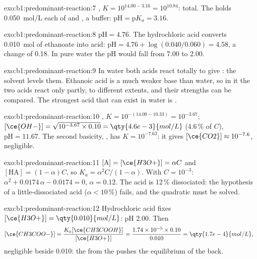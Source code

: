 \begin{solution}{exo:b1:predominant-reaction:7}
, $K = 10^{14.00 - 3.16} = 10^{10.84}$: total. The
 holds \qty{0.050}{mol/L} each of  and , a
buffer: $\mathrm{pH} = \mathrm{p}K_a = 3.16$.
\end{solution}

\begin{solution}{exo:b1:predominant-reaction:8}
$\mathrm{pH} = 4.76$. The hydrochloric acid converts \qty{0.010}{mol} of
ethanoate into acid: $\mathrm{pH} = 4.76 + \log(0.040/0.060) = 4.58$, a
change of 0.18. In pure water the pH would fall from 7.00 to 2.00.
\end{solution}

\begin{solution}{exo:b1:predominant-reaction:9}
In water both acids react totally to give : the solvent levels
them. Ethanoic acid is a much weaker base than water, so in it the two
acids react only partly, to different extents, and their strengths can be
compared. The strongest acid that can exist in water is .
\end{solution}

\begin{solution}{exo:b1:predominant-reaction:10}
, $K = 10^{-(14.00 - 10.33)} = 10^{-3.67}$;
$[\ce{OH-}] = \sqrt{10^{-3.67} \times 0.10} = \qty{4.6e-3}{mol/L}$ (4.6\,\%
of $C$), $\mathrm{pH} = 11.67$. The second basicity, , has $K = 10^{-7.63}$: it gives $[\ce{CO2}] \approx
10^{-7.6}$, negligible.
\end{solution}

\begin{solution}{exo:b1:predominant-reaction:11}
$[\mathrm{A}] = [\ce{H3O+}] = \alpha C$ and $[\mathrm{HA}] = (1 - \alpha)C$,
so $K_a = \alpha^2C/(1 - \alpha)$. With $C = 10^{-3}$: $\alpha^2 +
0.0174\,\alpha - 0.0174 = 0$, $\alpha = 0.12$. The acid is 12\,\%
dissociated: the hypothesis of a little-dissociated acid ($\alpha <
10\,\%$) fails, and the quadratic must be solved.
\end{solution}

\begin{solution}{exo:b1:predominant-reaction:12}
Hydrochloric acid fixes $[\ce{H3O+}] = \qty{0.010}{mol/L}$: pH 2.00. Then
\[
  [\ce{CH3COO-}] = \frac{K_a[\ce{CH3COOH}]}{[\ce{H3O+}]} = \frac{1.74 \times 10^{-5}
  \times 0.10}{0.010} = \qty{1.7e-4}{mol/L},
\]
negligible beside 0.010: the
 from the  pushes the equilibrium of the 
back.
\end{solution}

